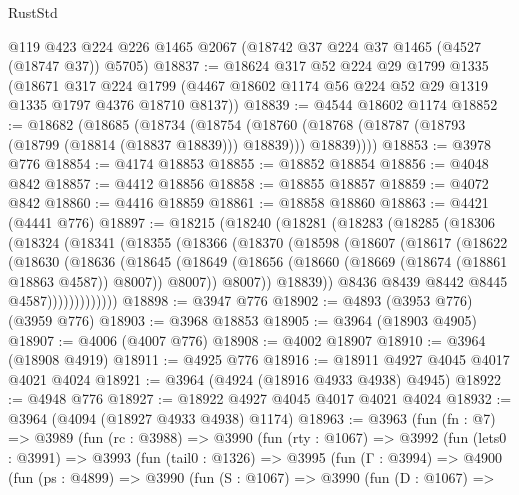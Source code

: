 \begin{lexlean}{RustStd}
\begin{coremodule}
    @119
    @423
    @224
    @226
    @1465
    @2067
    (@18742 @37 @224 @37 @1465 (@4527 (@18747 @37)) @5705)
@18837 := @18624
    @317
    @52
    @224
    @29
    @1799
    @1335
    (@18671
      @317
      @224
      @1799
      (@4467 @18602 @1174 @56 @224 @52 @29 @1319 @1335 @1797 @4376 @18710 @8137))
@18839 := @4544 @18602 @1174
@18852 := @18682
    (@18685
      (@18734
        (@18754
          (@18760 (@18768 (@18787 (@18793 (@18799 (@18814 (@18837 @18839))) @18839))) @18839))))
@18853 := @3978 @776
@18854 := @4174 @18853
@18855 := @18852 @18854
@18856 := @4048 @842
@18857 := @4412 @18856
@18858 := @18855 @18857
@18859 := @4072 @842
@18860 := @4416 @18859
@18861 := @18858 @18860
@18863 := @4421 (@4441 @776)
@18897 := @18215
    (@18240
      (@18281
        (@18283
          (@18285
            (@18306
              (@18324
                (@18341
                  (@18355
                    (@18366
                      (@18370
                        (@18598
                          (@18607
                            (@18617
                              (@18622
                                (@18630
                                  (@18636
                                    (@18645
                                      (@18649
                                        (@18656
                                          (@18660 (@18669 (@18674 (@18861 @18863 @4587)) @8007))
                                          @8007))
                                      @8007))
                                  @18839))
                              @8436
                              @8439
                              @8442
                              @8445
                              @4587)))))))))))))
@18898 := @3947 @776
@18902 := @4893 (@3953 @776) (@3959 @776)
@18903 := @3968 @18853
@18905 := @3964 (@18903 @4905)
@18907 := @4006 (@4007 @776)
@18908 := @4002 @18907
@18910 := @3964 (@18908 @4919)
@18911 := @4925 @776
@18916 := @18911 @4927 @4045 @4017 @4021 @4024
@18921 := @3964 (@4924 (@18916 @4933 @4938) @4945)
@18922 := @4948 @776
@18927 := @18922 @4927 @4045 @4017 @4021 @4024
@18932 := @3964 (@4094 (@18927 @4933 @4938) @1174)
@18963 := @3963
    (fun (fn : @7) =>
    @3989
      (fun (rc : @3988) =>
      @3990
        (fun (rty : @1067) =>
        @3992
          (fun (lets0 : @3991) =>
          @3993
            (fun (tail0 : @1326) =>
            @3995
              (fun (Γ : @3994) =>
              @4900
                (fun (ps : @4899) =>
                @3990
                  (fun (S : @1067) =>
                  @3990
                    (fun (D : @1067) =>

\end{coremodule}
\end{lexlean}
